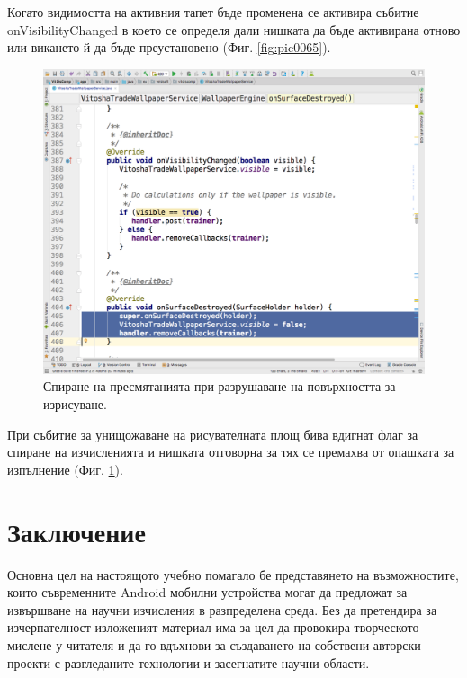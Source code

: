 \documentclass[book,14pt,oneside,openany]{memoir}
\begin{document}
Когато видимостта на активния тапет бъде променена се активира събитие onVisibilityChanged в което се определя дали нишката да бъде активирана отново или викането й да бъде преустановено (Фиг. \ref{fig:pic0065}).

\begin{figure}[h]
  \centering
  \includegraphics[height=0.45\pdfpageheight]{./images/pic0066.png}
  \caption{Спиране на пресмятанията при разрушаване на повърхността за изрисуване.}
\label{fig:pic0066}
\end{figure}
\FloatBarrier

При събитие за унищожаване на рисувателната площ бива вдигнат флаг за спиране на изчисленията и нишката отговорна за тях се премахва от опашката за изпълнение (Фиг. \ref{fig:pic0066}).

\newpage
{}
\chapter*{Заключение}

Основна цел на настоящото учебно помагало бе представянето на възможностите, които съвременните Android мобилни устройства могат да предложат за извършване на научни изчисления в разпределена среда. Без да претендира за изчерпателност изложеният материал има за цел да провокира творческото мислене у читателя и да го вдъхнови за създаването на собствени авторски проекти с разгледаните технологии и засегнатите научни области.  
\end{document}
